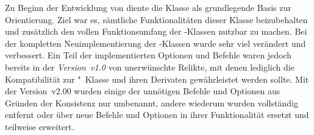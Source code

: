\begin{Entity*}{}
\noindent{}

\bigskip\noindent
Zu Beginn der Entwicklung von \TUDScript diente die Klasse  als 
grundlegende Basis zur Orientierung. Ziel war es, sämtliche Funktionalitäten 
dieser Klasse beizubehalten und zusätzlich den vollen Funktionsumfang der 
\KOMAScript-Klassen nutzbar zu machen. Bei der kompletten Neuimplementierung 
der \TUDScript-Klassen wurde sehr viel verändert und verbessert. Ein Teil der 
implementierten Optionen und Befehle waren jedoch bereits in der 
\emph{Version~v1.0} von \TUDScript unerwünschte Relikte, mit denen lediglich 
die Kompatibilität zur "~Klasse und ihren Derivaten 
gewährleistet werden sollte. Mit der Version~v2.00 wurden einige der unnötigen 
Befehle und Optionen aus Gründen der Konsistenz nur umbenannt, andere wiederum 
wurden vollständig entfernt oder über neue Befehle und Optionen in ihrer 
Funktionalität ersetzt und teilweise erweitert. 


\end{Entity*}
